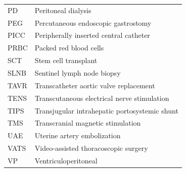 \documentclass[12pt,oneside]{book}
\begin{document}
\begin{footnotesize}
\begin{longtable}{@{}ll@{}}
PD & Peritoneal dialysis \\
PEG & Percutaneous endoscopic gastrostomy \\
PICC & Peripherally inserted central catheter \\
PRBC & Packed red blood cells \\
SCT & Stem cell transplant \\
SLNB & Sentinel lymph node biopsy \\
TAVR & Transcatheter aortic valve replacement \\
TENS & Transcutaneous electrical nerve stimulation \\
TIPS & Transjugular intrahepatic portosystemic shunt \\
TMS & Transcranial magnetic stimulation \\
UAE & Uterine artery embolization \\
VATS & Video-assisted thoracoscopic surgery \\
VP & Ventriculoperitoneal \\
\bottomrule
\end{longtable}
\end{footnotesize}

\mainmatter
\end{document}
